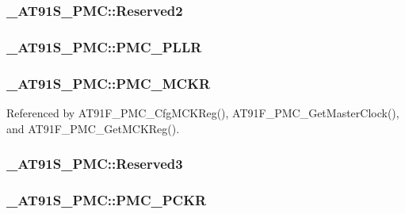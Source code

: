 \hypertarget{struct__AT91S__PMC_41029227f612f1bf9f802d606fee55af}{
\subsubsection{ {\bf \_\-AT91S\_\-PMC::Reserved2}}}
\label{struct__AT91S__PMC_41029227f612f1bf9f802d606fee55af}


\hypertarget{struct__AT91S__PMC_5e9f5310c24be113b680a6bd890d5813}{
\subsubsection{ {\bf \_\-AT91S\_\-PMC::PMC\_\-PLLR}}}
\label{struct__AT91S__PMC_5e9f5310c24be113b680a6bd890d5813}


\hypertarget{struct__AT91S__PMC_7172b8a93b54c122f4e7ca6c6aa6520c}{
\subsubsection{ {\bf \_\-AT91S\_\-PMC::PMC\_\-MCKR}}}
\label{struct__AT91S__PMC_7172b8a93b54c122f4e7ca6c6aa6520c}




Referenced by AT91F\_\-PMC\_\-CfgMCKReg(), AT91F\_\-PMC\_\-GetMasterClock(), and AT91F\_\-PMC\_\-GetMCKReg().\hypertarget{struct__AT91S__PMC_02606d2b8a0950a0c616d5572d2e5a18}{
\subsubsection{ {\bf \_\-AT91S\_\-PMC::Reserved3}}}
\label{struct__AT91S__PMC_02606d2b8a0950a0c616d5572d2e5a18}


\hypertarget{struct__AT91S__PMC_ac8a948cb33750b1a43e09bc6fbd7903}{
\subsubsection{ {\bf \_\-AT91S\_\-PMC::PMC\_\-PCKR}}}
\label{struct__AT91S__PMC_ac8a948cb33750b1a43e09bc6fbd7903}




